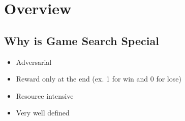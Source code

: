 \section{Overview}

  \subsection{Why is Game Search Special}

    \begin{itemize}
      \item Adversarial
      \item Reward only at the end (ex. 1 for win and 0 for lose)
      \item Resource intensive
      \item Very well defined
    \end{itemize}